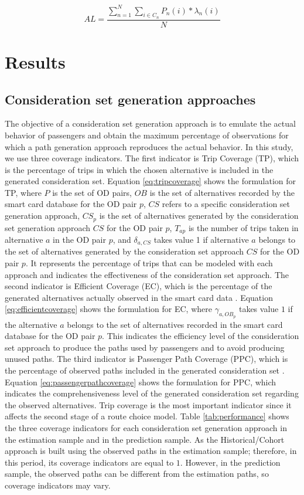 \documentclass[12pt,a4paper]{article}
\begin{document}
\begin{equation} \label{eq:predictional}
AL = \frac{\sum_{n = 1}^{N} \sum_{i \in C_{n}} P_{n}(i)*\lambda_{n}(i)}{N}
\end{equation}

\section{Results}

\subsection{Consideration set generation approaches}

The objective of a consideration set generation approach is to emulate the actual behavior of passengers and obtain the maximum percentage of observations for which a path generation approach reproduces the actual behavior. In this study, we use three coverage indicators. The first indicator is Trip Coverage (TP), which is the percentage of trips in which the chosen alternative is included in the generated consideration set. Equation \ref{eq:tripcoverage} shows the formulation for TP, where $P$ is the set of OD pairs, $OB$ is the set of alternatives recorded by the smart card database for the OD pair $p$, $CS$ refers to a specific consideration set generation approach, $CS_{p}$ is the set of alternatives generated by the consideration set generation approach $CS$ for the OD pair $p$, $T_{ap}$ is the number of trips taken in alternative $a$ in the OD pair $p$, and $\delta_{a,CS}$ takes value 1 if alternative $a$ belongs to the set of alternatives generated by the consideration set approach $CS$ for the OD pair $p$. It represents the percentage of trips that can be modeled with each approach and indicates the effectiveness of the consideration set approach. The second indicator is Efficient Coverage (EC), which is the percentage of the generated alternatives actually observed in the smart card data \citep{rui2016modeling}. Equation \ref{eq:efficientcoverage} shows the formulation for EC, where $\gamma_{a,OB_{p}}$ takes value $1$ if the alternative $a$ belongs to the set of alternatives recorded in the smart card database for the OD pair $p$. This indicates the efficiency level of the consideration set approach to produce the paths used by passengers and to avoid producing unused paths. The third indicator is Passenger Path Coverage (PPC), which is the percentage of observed paths included in the generated consideration set \citep{rui2016modeling}. Equation \ref{eq:passengerpathcoverage} shows the formulation for PPC, which indicates the comprehensiveness level of the generated consideration set regarding the observed alternatives. Trip coverage is the most important indicator since it affects the second stage of a route choice model. Table \ref{tab:performance} shows the three coverage indicators for each consideration set generation approach in the estimation sample and in the prediction sample. As the Historical/Cohort approach is built using the observed paths in the estimation sample; therefore, in this period, its coverage indicators are equal to $1$. However, in the prediction sample, the observed paths can be different from the estimation paths, so coverage indicators may vary.
\end{document}
